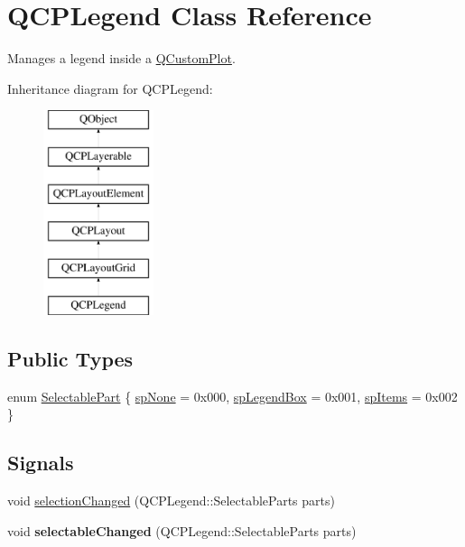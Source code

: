 \hypertarget{class_q_c_p_legend}{}\section{Q\+C\+P\+Legend Class Reference}
\label{class_q_c_p_legend}


Manages a legend inside a \hyperlink{class_q_custom_plot}{Q\+Custom\+Plot}.  


Inheritance diagram for Q\+C\+P\+Legend\+:\begin{figure}[H]
\begin{center}
\leavevmode
\includegraphics[height=6.000000cm]{class_q_c_p_legend}
\end{center}
\end{figure}
\subsection*{Public Types}
\begin{DoxyCompactItemize}
\item 
enum \hyperlink{class_q_c_p_legend_a5404de8bc1e4a994ca4ae69e2c7072f1}{Selectable\+Part} \{ \hyperlink{class_q_c_p_legend_a5404de8bc1e4a994ca4ae69e2c7072f1a378201c07d500af7126e3ec91652eed7}{sp\+None} = 0x000, 
\hyperlink{class_q_c_p_legend_a5404de8bc1e4a994ca4ae69e2c7072f1a0fa4758962a46fa1dc9da818abae23c4}{sp\+Legend\+Box} = 0x001, 
\hyperlink{class_q_c_p_legend_a5404de8bc1e4a994ca4ae69e2c7072f1a768bfb95f323db4c66473375032c0af7}{sp\+Items} = 0x002
 \}
\end{DoxyCompactItemize}
\subsection*{Signals}
\begin{DoxyCompactItemize}
\item 
void \hyperlink{class_q_c_p_legend_a82c88464edac07a9eefaf3906268df3b}{selection\+Changed} (Q\+C\+P\+Legend\+::\+Selectable\+Parts parts)
\item 
\hypertarget{class_q_c_p_legend_a8a77300fd0976d6bdd8000f4e8d114b8}{}\label{class_q_c_p_legend_a8a77300fd0976d6bdd8000f4e8d114b8} 
void {\bfseries selectable\+Changed} (Q\+C\+P\+Legend\+::\+Selectable\+Parts parts)
\end{DoxyCompactItemize}
